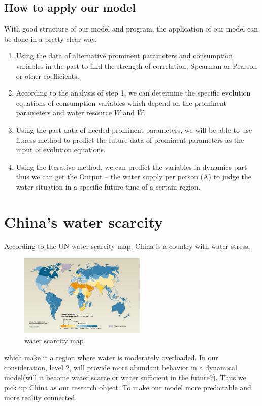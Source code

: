   \clearpage
  \subsection{How to apply our model}

    With good structure of our model and program, the application of our model can be done in a pretty clear way.

    \begin{enumerate}[step 1]
      \item Using the data of alternative prominent parameters and consumption variables in the past to find the strength of correlation, Spearman or Pearson or other coefficients.
      \item According to the analysis of step 1, we can  determine the specific evolution equations of consumption variables which depend on the prominent parameters and water resource $W$ and $\bar{W}$.
      \item Using the past data of needed prominent parameters, we will be able to use fitness method to predict the future data of prominent parameters as the input of evolution equations.
      \item Using the Iterative method, we can predict the variables in dynamics part thus we can get the Output -- the water supply per person (A) to judge the water situation in a specific future time of a certain region.
    \end{enumerate}



\section{China's water scarcity}
  According to the UN water scarcity map, China is a country with water stress,
  \begin{figure}
  \includegraphics[width = 6cm]{picture/WaterScarcityMap.jpg}
  \caption{water scarcity map\cite{WaterScarcityMap}}
  \end{figure}
  which make it a region where water is moderately overloaded. In our consideration, level 2, will provide more abundant behavior in a dynamical model(will it become water scarce or water sufficient in the future?). Thus we pick up China as our research object. To make our model more predictable and more reality connected.

